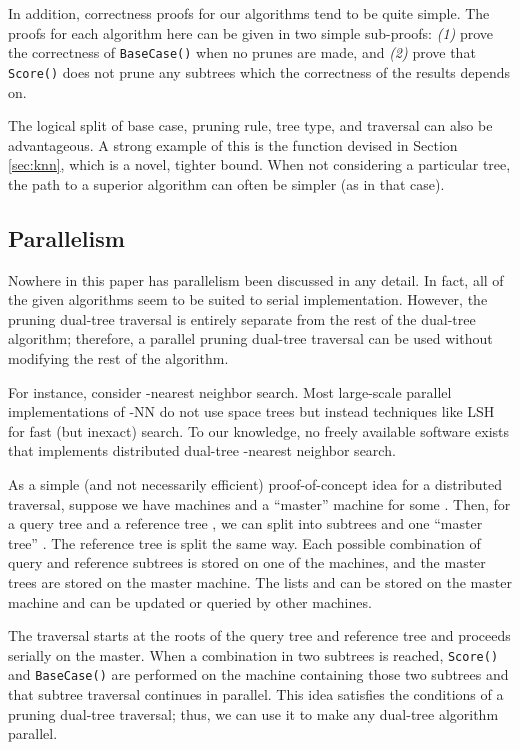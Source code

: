 \documentclass{article}
\begin{document}
\vspace*{-0.2em}
In addition, correctness proofs for our algorithms tend to be quite simple.  The
proofs for each algorithm here can be given in two simple sub-proofs:
\textit{(1)} prove the correctness of \texttt{BaseCase()} when no prunes are
made, and \textit{(2)} prove that \texttt{Score()} does not prune any subtrees
which the correctness of the results depends on.

\vspace*{-0.2em}
The logical split of base case, pruning rule, tree type, and traversal can also
be advantageous.  A strong example of this is the function 
devised in Section \ref{sec:knn}, which is a novel, tighter bound.  When not
considering a particular tree, the path to a superior algorithm can often be
simpler (as in that case).

\subsection{Parallelism}

Nowhere in this paper has parallelism been discussed in any detail.  In fact,
all of the given algorithms seem to be suited to serial implementation.
However, the pruning dual-tree traversal is entirely separate from the rest of
the dual-tree algorithm; therefore, a parallel pruning dual-tree traversal can
be used without modifying the rest of the algorithm.

\vspace*{-0.2em}
For instance, consider -nearest neighbor search.  Most large-scale parallel
implementations of -NN do not use space trees but instead techniques like
LSH for fast (but inexact) search.  To our knowledge, no freely available
software exists that implements distributed dual-tree -nearest neighbor
search.

\vspace*{-0.2em}
As a simple (and not necessarily efficient) proof-of-concept idea for a
distributed traversal, suppose we have  machines and a ``master'' machine
for some .  Then, for a query tree  and a reference tree
, we can split  into  subtrees and one ``master
tree'' .  The reference tree  is split the same
way.  Each possible combination of query and reference subtrees is stored on one
of the  machines, and the master trees are stored on the master machine.
The lists  and  can be stored on the master machine and can be updated or
queried by other machines.

\vspace*{-0.2em}
The traversal starts at the roots of the query tree and reference tree and
proceeds serially on the master.  When a combination in two subtrees is reached,
\texttt{Score()} and \texttt{BaseCase()} are performed on the machine containing
those two subtrees and that subtree traversal continues in parallel.  This idea
satisfies the conditions of a pruning dual-tree traversal; thus, we can use it
to make any dual-tree algorithm parallel.
\end{document}

